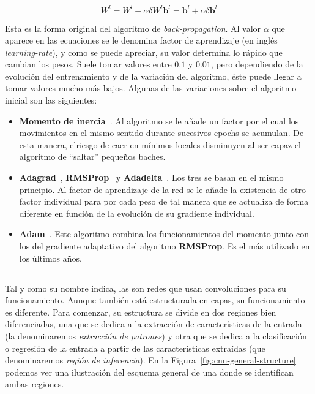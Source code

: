 \begin{subequations}
	\begin{equation}
		W^l = W^l + \alpha \delta W^l \label{eq:error-applied-to-weights}
	\end{equation}
	\begin{equation}
		\mathbf{b}^l = \mathbf{b}^l + \alpha \delta \mathbf{b}^l \label{eq:error-applied-to-bias}
	\end{equation}
\end{subequations}

Esta es la forma original del algoritmo de \textit{back-propagation}. Al valor $\alpha$ que aparece en las ecuaciones se le denomina factor de aprendizaje (en inglés \textit{learning-rate}), y como se puede apreciar, su valor determina lo rápido que cambian los pesos. Suele tomar valores entre $0.1$ y $0.01$, pero dependiendo de la evolución del entrenamiento y de la variación del algoritmo, éste puede llegar a tomar valores mucho más bajos. Algunas de las variaciones sobre el algoritmo inicial son las siguientes:

\begin{itemize}
	\item \textbf{Momento de inercia}~\cite{qian1999momentum}. Al algoritmo se le añade un factor por el cual los movimientos en el mismo sentido durante sucesivos epochs se acumulan. De esta manera, elriesgo de caer en mínimos locales disminuyen al ser capaz el algoritmo de \enquote{saltar} pequeños baches.
	\item \textbf{Adagrad}~\cite{duchi2011adaptive}, \textbf{RMSProp}~\cite{tieleman2012lecture} y \textbf{Adadelta}~\cite{zeiler2012adadelta}. Los tres se basan en el mismo principio. Al factor de aprendizaje de la red se le añade la existencia de otro factor individual para por cada peso de tal manera que se actualiza de forma diferente en función de la evolución de su gradiente individual.
	\item \textbf{Adam}~\cite{kingma2014adam}. Este algoritmo combina los funcionamientos del momento junto con los del gradiente adaptativo del algoritmo \textbf{RMSProp}. Es el más utilizado en los últimos años.
\end{itemize}

\subsection{}

Tal y como su nombre indica, las  son redes que usan convoluciones para su funcionamiento. Aunque también está estructurada en capas, su funcionamiento es diferente. Para comenzar, su estructura se divide en dos regiones bien diferenciadas, una que se dedica a la extracción de características de la entrada (la denominaremos \textit{extracción de patrones}) y otra que se dedica a la clasificación o regresión de la entrada a partir de las características extraídas (que denominaremos \textit{región de inferencia}). En la Figura~\ref{fig:cnn-general-structure} podemos ver una ilustración del esquema general de una  donde se identifican ambas regiones.

